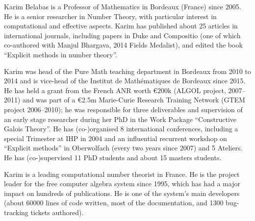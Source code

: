 \begin{participant}[type=PI,PM=12,gender=male]{Karim Belabas}
is a Professor of Mathematics in Bordeaux (France) since 2005. He is
a senior researcher in Number Theory, with particular interest in
computational and effective aspects. Karim has published about 25 articles
in international journals, including papers in Duke and Compositio (one of
which co-authored with Manjul Bhargava, 2014 Fields Medalist), and
edited the book ``Explicit methods in number theory''.

Karim was head of the Pure Math teaching department in Bordeaux from 2010 to
2014 and is vice-head of the Institut de Math\'ematiques de Bordeaux since
2015. He has held a grant from the French ANR worth \euro$200$k (ALGOL
project, 2007--2011) and was part of a \euro{2.5}m Marie-Curie Research
Training Network (GTEM project 2006--2010); he was responsible for three
deliverables and supervision of an early stage researcher during her PhD in
the Work Package ``Constructive Galois Theory''. He has (co-)organised 8
international conferences, including a special Trimester at IHP in 2004 and
an influential recurrent workshop on ``Explicit methods'' in Oberwolfach
(every two years since 2007) and 5 \PariGP Ateliers. He has (co-)supervised
11 PhD students and about 15 masters students.

Karim is a leading computational number theorist in France. He
is the project leader for the \PariGP free computer algebra system since
1995, which has had a major impact on hundreds of publications. He is one of
the system's main developers (about 60000 lines of code written, most of the
documentation, and 1300 bug-tracking tickets authored).
\end{participant}
